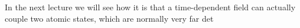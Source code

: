 In the next lecture we will see how it is that a time-dependent field can actually couple two atomic states, which are normally very far det